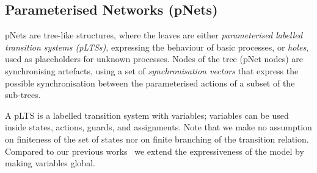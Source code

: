 \documentclass{elsarticle}
\newcommand{\ERIC}[1]{\textcolor{blue}{#1}}
\newcommand{\LUDO}[1]{\textcolor{darkgreen}{#1}}
\begin{document}
%
% 

\subsection{Parameterised Networks (pNets)}
\label{section:pnets}

pNets are tree-like structures, where the leaves are either \emph{parameterised labelled transition systems (pLTSs)}, expressing the
behaviour of basic processes, or \emph{holes}, used as placeholders
for unknown processes. 
Nodes of the tree (pNet nodes) are synchronising artefacts, using a
set of \emph{synchronisation vectors} that express the possible
synchronisation between the parameterised actions of a subset of the sub-trees.



A pLTS is a labelled transition system with variables; variables can be
used inside states, actions, guards, and
assignments. 
Note that we make no assumption on finiteness of the set of states nor
on finite branching of the transition relation. Compared to our previous works~\cite{henrio:Forte2016,AmeurBoulifa2017} we extend the expressiveness of the model by making variables global.
\end{document}
